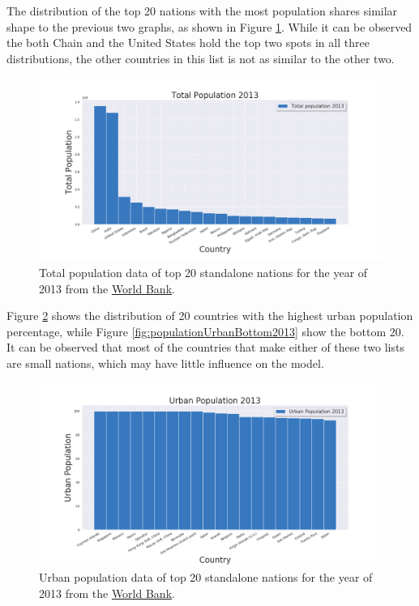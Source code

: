 \documentclass[11pt,a4paper,titlepage]{article}
\begin{document}
The distribution of the top 20 nations with the most population shares similar shape to the previous two graphs, as shown in Figure \ref{fig:populationTotal2013}. While it can be observed the both Chain and the United States hold the top two spots in all three distributions, the other countries in this list is not as similar to the other two.

\begin{figure}[!htbp]
    \begin{center}
        \includegraphics[width=\textwidth]{../Plots/populationTotal_2013.png}
        \caption{Total population data of top 20 standalone nations for the year of 2013 from the \href{https://www.worldbank.org/}{World Bank}.}
        \label{fig:populationTotal2013}
    \end{center}
\end{figure}

Figure \ref{fig:populationUrban2013} shows the distribution of 20 countries with the highest urban population percentage, while Figure \ref{fig:populationUrbanBottom2013} show the bottom 20. It can be observed that most of the countries that make either of these two lists are small nations, which may have little influence on the model.

\begin{figure}[!htbp]
    \begin{center}
        \includegraphics[width=\textwidth]{../Plots/populationUrban_2013.png}
        \caption{Urban population data of top 20 standalone nations for the year of 2013 from the \href{https://www.worldbank.org/}{World Bank}.}
        \label{fig:populationUrban2013}
    \end{center}
\end{figure}
\end{document}
